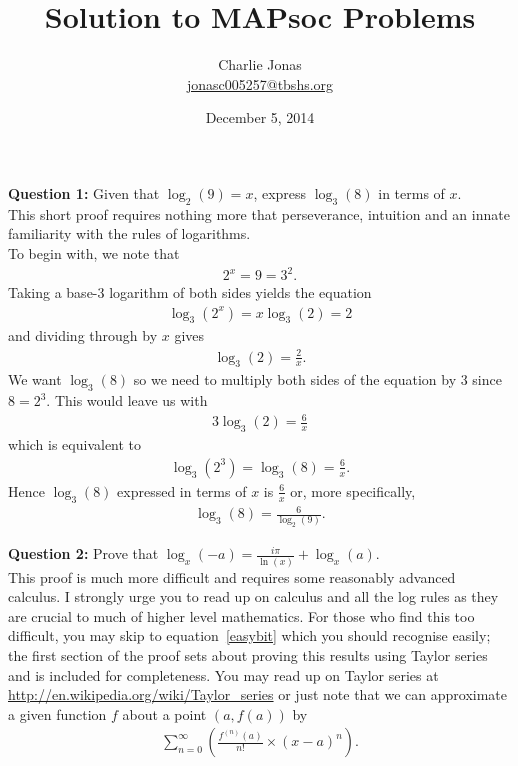 \documentclass[12pt]{article}
\title{Solution to MAPsoc Problems}
\author{Charlie Jonas\\ \href{mailto:jonasc005257@tbshs.org}{jonasc005257@tbshs.org}}
\date{December 5, 2014}
\begin{document}
\maketitle

\noindent
\textbf{Question 1:} Given that $ \log_2 (9) = x $, express $ \log_3 (8) $ in terms of $ x $.\\

\noindent
This short proof requires nothing more that perseverance, intuition and an innate familiarity with the rules of logarithms.\\

\noindent
To begin with, we note that
\begin{align}
2^{x} = 9 = 3^2.
\end{align}
Taking a base-3 logarithm of both sides yields the equation
\begin{align}
\log_3 (2^{x}) = x\log_3 (2) = 2
\end{align}
and dividing through by $ x $ gives
\begin{align}
\log_3 (2) = \frac{2}{x}.
\end{align}
We want $ \log_3 (8) $ so we need to multiply both sides of the equation by 3 since $ 8 = 2^{3} $. This would leave us with
\begin{align}
3\log_3 (2) = \frac{6}{x}
\end{align}
which is equivalent to
\begin{align}
\log_3 (2^{3}) = \log_3 (8) = \frac{6}{x}.
\end{align}
Hence $ \log_3 (8) $ expressed in terms of $ x $ is $ \frac{6}{x} $ or, more specifically,
\begin{align}
\log_3 (8) = \frac{6}{\log_2 (9)}.
\end{align}

\pagebreak

\noindent
\textbf{Question 2:} Prove that $ \log_x (-a) = \frac{i\pi}{\ln (x)} + \log_x (a) $.\\

\noindent
This proof is much more difficult and requires some reasonably advanced calculus. I strongly urge you to read up on calculus and all the log rules as they are crucial to much of higher level mathematics. For those who find this too difficult, you may skip to equation~\eqref{easybit} which you should recognise easily; the first section of the proof sets about proving this results using Taylor series and is included for completeness. You may read up on Taylor series at \url{http://en.wikipedia.org/wiki/Taylor_series} or just note that we can approximate a given function $ f $ about a point $ (a, f(a)) $ by
\begin{align}
\sum_{n=0}^{\infty} \left(\frac {f^{(n)}(a)}{n!} \times (x-a)^{n}\right).
\end{align}\\
\end{document}
